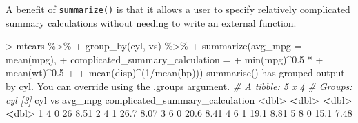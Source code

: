 \documentclass[
]{book}
\newenvironment{Shaded}{\begin{snugshade}}{\end{snugshade}}
\newcommand{\AttributeTok}[1]{\textcolor[rgb]{0.77,0.63,0.00}{#1}}
\newcommand{\CommentTok}[1]{\textcolor[rgb]{0.56,0.35,0.01}{\textit{#1}}}
\newcommand{\DecValTok}[1]{\textcolor[rgb]{0.00,0.00,0.81}{#1}}
\newcommand{\ErrorTok}[1]{\textcolor[rgb]{0.64,0.00,0.00}{\textbf{#1}}}
\newcommand{\FloatTok}[1]{\textcolor[rgb]{0.00,0.00,0.81}{#1}}
\newcommand{\FunctionTok}[1]{\textcolor[rgb]{0.00,0.00,0.00}{#1}}
\newcommand{\NormalTok}[1]{#1}
\newcommand{\SpecialCharTok}[1]{\textcolor[rgb]{0.00,0.00,0.00}{#1}}
\newcommand{\StringTok}[1]{\textcolor[rgb]{0.31,0.60,0.02}{#1}}
\begin{document}
A benefit of \texttt{summarize()} is that it allows a user to specify relatively complicated summary calculations without needing to write an external function.

\begin{Shaded}
\begin{Highlighting}[]
\SpecialCharTok{\textgreater{}}\NormalTok{ mtcars }\SpecialCharTok{\%\textgreater{}\%} 
\SpecialCharTok{+}   \FunctionTok{group\_by}\NormalTok{(cyl, vs) }\SpecialCharTok{\%\textgreater{}\%} 
\SpecialCharTok{+}   \FunctionTok{summarize}\NormalTok{(}\AttributeTok{avg\_mpg =} \FunctionTok{mean}\NormalTok{(mpg),}
\SpecialCharTok{+}             \AttributeTok{complicated\_summary\_calculation =} 
\SpecialCharTok{+}               \FunctionTok{min}\NormalTok{(mpg)}\SpecialCharTok{\^{}}\FloatTok{0.5} \SpecialCharTok{*} 
\SpecialCharTok{+}               \FunctionTok{mean}\NormalTok{(wt)}\SpecialCharTok{\^{}}\FloatTok{0.5} \SpecialCharTok{+} 
\SpecialCharTok{+}               \FunctionTok{mean}\NormalTok{(disp)}\SpecialCharTok{\^{}}\NormalTok{(}\DecValTok{1}\SpecialCharTok{/}\FunctionTok{mean}\NormalTok{(hp)))}
\StringTok{\textasciigrave{}}\AttributeTok{summarise()}\StringTok{\textasciigrave{}}\NormalTok{ has grouped output by }\StringTok{\textquotesingle{}cyl\textquotesingle{}}\NormalTok{. You can override using the }\StringTok{\textasciigrave{}}\AttributeTok{.groups}\StringTok{\textasciigrave{}}\NormalTok{ argument.}
\CommentTok{\# A tibble: 5 x 4}
\CommentTok{\# Groups:   cyl [3]}
\NormalTok{    cyl    vs avg\_mpg complicated\_summary\_calculation}
  \SpecialCharTok{\textless{}}\NormalTok{dbl}\SpecialCharTok{\textgreater{}} \ErrorTok{\textless{}}\NormalTok{dbl}\SpecialCharTok{\textgreater{}}   \ErrorTok{\textless{}}\NormalTok{dbl}\SpecialCharTok{\textgreater{}}                           \ErrorTok{\textless{}}\NormalTok{dbl}\SpecialCharTok{\textgreater{}}
\DecValTok{1}     \DecValTok{4}     \DecValTok{0}    \DecValTok{26}                              \FloatTok{8.51}
\DecValTok{2}     \DecValTok{4}     \DecValTok{1}    \FloatTok{26.7}                            \FloatTok{8.07}
\DecValTok{3}     \DecValTok{6}     \DecValTok{0}    \FloatTok{20.6}                            \FloatTok{8.41}
\DecValTok{4}     \DecValTok{6}     \DecValTok{1}    \FloatTok{19.1}                            \FloatTok{8.81}
\DecValTok{5}     \DecValTok{8}     \DecValTok{0}    \FloatTok{15.1}                            \FloatTok{7.48}
\end{Highlighting}
\end{Shaded}
\end{document}
